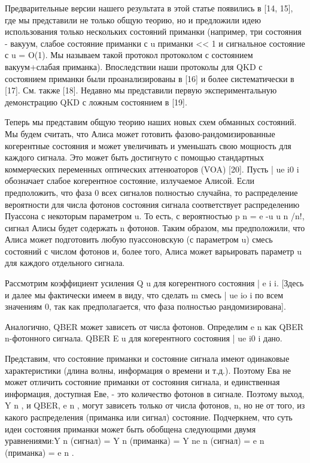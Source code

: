 Предварительные версии нашего результата в этой статье появились в [14, 15], где мы представили не только общую теорию, но и предложили идею использования только нескольких состояний приманки (например, три состояния - вакуум, слабое состояние приманки с u приманки << 1 и сигнальное состояние с u = O(1). Мы называем такой протокол протоколом с состоянием вакуум+слабая приманка). Впоследствии наши протоколы для QKD с состоянием приманки были проанализированы в [16] и более систематически в [17]. См. также [18]. Недавно мы представили первую экспериментальную демонстрацию QKD с ложным состоянием в [19].

Теперь мы представим общую теорию наших новых схем обманных состояний. Мы будем считать, что Алиса может готовить фазово-рандомизированные когерентные состояния и может увеличивать и уменьшать свою мощность для каждого сигнала. Это может быть достигнуто с помощью стандартных коммерческих переменных оптических аттенюаторов (VOA) [20]. Пусть | ue i0 i обозначает слабое когерентное состояние, излучаемое Алисой. Если предположить, что фаза 0 всех сигналов полностью случайна, то распределение вероятности для числа фотонов состояния сигнала соответствует распределению Пуассона с некоторым параметром u. То есть, с вероятностью p n = e -u u n /n!, сигнал Алисы будет содержать n фотонов. Таким образом, мы предположили, что Алиса может подготовить любую пуассоновскую (с параметром u) смесь состояний с числом фотонов и, более того, Алиса может варьировать параметр u для каждого отдельного сигнала.

Рассмотрим коэффициент усиления Q u для когерентного состояния | e i i. [Здесь и далее мы фактически имеем в виду, что сделать m смесь | ue io i по всем значениям 0, так как предполагается, что фаза полностью рандомизирована].

Аналогично, QBER может зависеть от числа фотонов. Определим e n как QBER n-фотонного сигнала. QBER E u для когерентного состояния | ue i0 i дано.

Представим, что состояние приманки и состояние сигнала имеют одинаковые характеристики (длина волны, информация о времени и т.д.). Поэтому Ева не может отличить состояние приманки от состояния сигнала, и единственная информация, доступная Еве, - это количество фотонов в сигнале. Поэтому выход, Y n , и QBER, e n , могут зависеть только от числа фотонов, n, но не от того, из какого распределения (приманка или сигнал) состояние. Подчеркнем, что суть идеи состояния приманки может быть обобщена следующими двумя уравнениями:Y n (сигнал) = Y n (приманка) = Y ne n (сигнал) = e n (приманка) = e n .


